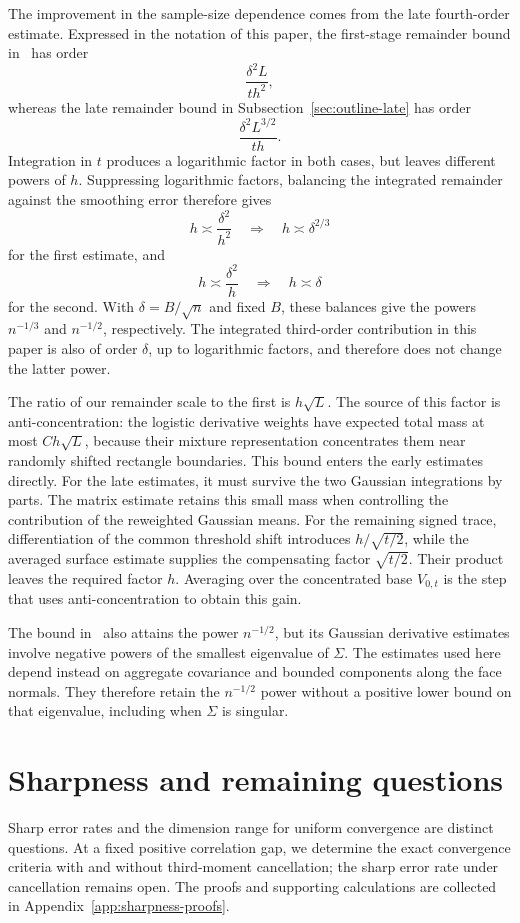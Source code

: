 \documentclass[11pt,letterpaper]{article}
\theoremstyle{remark}
\begin{document}
The improvement in the sample-size dependence comes from the late
fourth-order estimate. Expressed in the notation of this paper, the
first-stage remainder bound in~\cite[Proposition~2]{GaoZhang} has order
\[
 \frac{\delta^2L}{th^2},
\]
whereas the late remainder bound in
Subsection~\ref{sec:outline-late} has order
\[
 \frac{\delta^2L^{3/2}}{th}.
\]
Integration in \(t\) produces a logarithmic factor in both cases,
but leaves different powers of \(h\). Suppressing logarithmic
factors, balancing the integrated remainder against the smoothing
error therefore gives
\[
 h\asymp\frac{\delta^2}{h^2}
 \quad\Longrightarrow\quad h\asymp\delta^{2/3}
\]
for the first estimate, and
\[
 h\asymp\frac{\delta^2}{h}
 \quad\Longrightarrow\quad h\asymp\delta
\]
for the second. With \(\delta=B/\sqrt n\) and fixed \(B\), these
balances give the powers \(n^{-1/3}\) and \(n^{-1/2}\), respectively.
The integrated third-order contribution in this paper is also of
order \(\delta\), up to logarithmic factors, and therefore does
not change the latter power.

The ratio of our remainder scale to the first is \(h\sqrt L\).
The source of this factor is anti-concentration: the logistic
derivative weights have expected total mass at most \(Ch\sqrt L\),
because their mixture representation concentrates them near randomly
shifted rectangle boundaries. This bound enters the early estimates
directly. For the late estimates, it must survive the two Gaussian
integrations by parts. The matrix estimate retains this small mass
when controlling the contribution of the reweighted Gaussian means.
For the remaining signed trace, differentiation of the common
threshold shift introduces \(h/\sqrt{t/2}\), while the averaged
surface estimate supplies the compensating factor \(\sqrt{t/2}\).
Their product leaves the required factor \(h\). Averaging over the
concentrated base \(V_{0,t}\) is the step that uses anti-concentration
to obtain this gain.

The bound in~\cite{AL} also attains the power \(n^{-1/2}\), but its
Gaussian derivative estimates involve negative powers of the
smallest eigenvalue of \(\Sigma\). The estimates used here depend
instead on aggregate covariance and bounded components along the
face normals. They therefore retain the \(n^{-1/2}\) power without
a positive lower bound on that eigenvalue, including when
\(\Sigma\) is singular.


\section{Sharpness and remaining questions}\label{opt:section}
Sharp error rates and the dimension range for uniform convergence are
distinct questions. At a fixed positive correlation gap, we determine
the exact convergence criteria with and without third-moment
cancellation; the sharp error rate under cancellation remains open.
The proofs and supporting calculations are collected in
Appendix~\ref{app:sharpness-proofs}.
\end{document}
